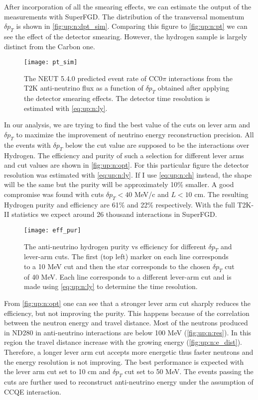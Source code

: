 \documentclass[main.tex]{subfiles}
\begin{document}
After incorporation of all the smearing effects, we can estimate the output of the measurements with SuperFGD. The distribution of the transversal momentum $\delta p_T$ is shown in \autoref{fig:up:n:dpt_sim}. Comparing this figure to \autoref{fig:up:n:pt} we can see the effect of the detector smearing. However, the hydrogen sample is largely distinct from the Carbon one.

\begin{figure}[!ht]
  \centering
  \texttt{[image: pt\_sim]}
  \caption{The NEUT 5.4.0 predicted event rate of CC0$\pi$ interactions from the T2K anti-neutrino flux as a function of $\delta p_T$ obtained after applying the detector smearing effects. The detector time resolution is estimated with \autoref{eq:up:n:ly}.}
  \label{fig:up:n:dpt_sim}
\end{figure}

In our analysis, we are trying to find the best value of the cuts on lever arm and $\delta p_T$ to maximize the improvement of neutrino energy reconstruction precision. All the events with $\delta p_T$ below the cut value are supposed to be the interactions over Hydrogen. The efficiency and purity of such a selection for different lever arms and cut values are shown in \autoref{fig:up:n:opt}. For this particular figure the detector resolution was estimated with \autoref{eq:up:n:ly}. If I use \autoref{eq:up:n:ch} instead, the shape will be the same but the purity will be approximately 10\% smaller. A good compromise was found with cuts $\delta p_T < 40$ MeV/c and $L < 10$ cm. The resulting Hydrogen purity and efficiency are 61\% and 22\% respectively. With the full T2K-II statistics we expect around 26 thousand interactions in SuperFGD.

\begin{figure}[!ht]
  \centering
  \texttt{[image: eff\_pur]}
  \caption{The anti-neutrino hydrogen purity vs efficiency for different $\delta p_T$ and lever-arm cuts. The first (top left) marker on each line corresponds to a 10 MeV cut and then the star corresponds to the chosen $\delta p_T$ cut of 40 MeV. Each line corresponds to a different lever-arm cut and is made using \autoref{eq:up:n:ly} to determine the time resolution.}
  \label{fig:up:n:opt}
\end{figure}

From \autoref{fig:up:n:opt} one can see that a stronger lever arm cut sharply reduces the efficiency, but not improving the purity. This happens because of the correlation between the neutron energy and travel distance. Most of the neutrons produced in ND280 in anti-neutrino interactions are below 100 MeV (\autoref{fig:up:n:res}). In this region the travel distance increase with the growing energy (\autoref{fig:up:n:e_dist}). Therefore, a longer lever arm cut accepts more energetic thus faster neutrons and the energy resolution is not improving. The best performance is expected with the lever arm cut set to 10 cm and $\delta p_T$ cut set to 50 MeV. The events passing the cuts are further used to reconstruct anti-neutrino energy under the assumption of CCQE interaction.
\end{document}
